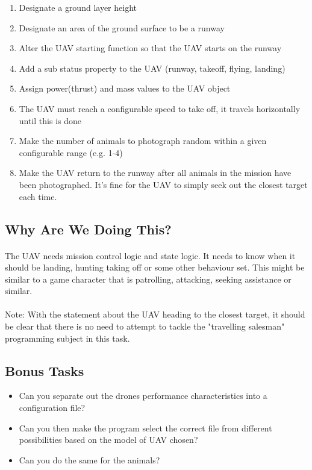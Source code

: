 \documentclass[11pt]{book}
\begin{document}
\begin{enumerate}
\item Designate a ground layer height
\item Designate an area of the ground surface to be a runway
\item Alter the UAV starting function so that the UAV starts on the runway
\item Add a sub status property to the UAV (runway, takeoff, flying, landing)
\item Assign power(thrust) and mass values to the UAV object
\item The UAV must reach a configurable speed to take off, it travels horizontally until this is done
\item Make the number of animals to photograph random within a given configurable range (e.g. 1-4)
\item Make the UAV return to the runway after all animals in the mission have been photographed. It's fine for the UAV to simply seek out the closest target each time.
\end{enumerate}

\subsection{Why Are We Doing This?}

\paragraph{} The UAV needs mission control logic and state logic. It needs to
know when it should be landing, hunting taking off or some other behaviour
set. This might be similar to a game character that is patrolling, attacking,
seeking assistance or similar.

\paragraph{} Note: With the statement about the UAV heading to the closest
target, it should be clear that there is no need to attempt to tackle the
"travelling salesman" programming subject in this task.

\subsection{Bonus Tasks}

\begin{itemize}
\item Can you separate out the drones performance characteristics into a configuration file?
\item Can you then make the program select the correct file from different possibilities based on the model of UAV chosen? 
\item Can you do the same for the animals?
\end{itemize}
\end{document}
